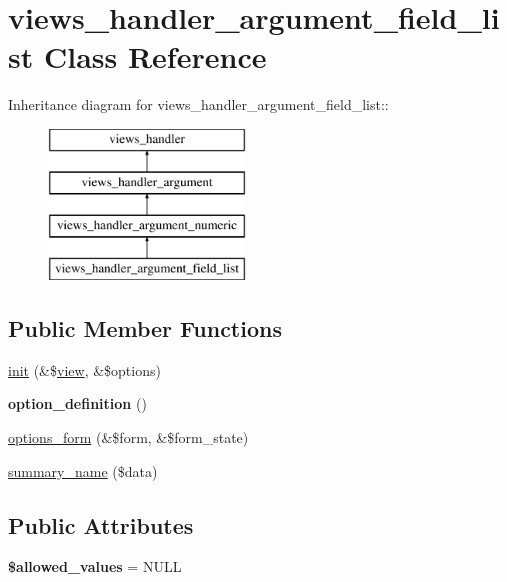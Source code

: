 \hypertarget{classviews__handler__argument__field__list}{
\section{views\_\-handler\_\-argument\_\-field\_\-list Class Reference}
\label{classviews__handler__argument__field__list}
}
Inheritance diagram for views\_\-handler\_\-argument\_\-field\_\-list::\begin{figure}[H]
\begin{center}
\leavevmode
\includegraphics[height=4cm]{classviews__handler__argument__field__list}
\end{center}
\end{figure}
\subsection*{Public Member Functions}
\begin{DoxyCompactItemize}
\item 
\hyperlink{classviews__handler__argument__field__list_ad0fd51038ca7c41ddd7f63715cb3c733}{init} (\&\$\hyperlink{classview}{view}, \&\$options)
\item 
\hypertarget{classviews__handler__argument__field__list_abfca864deef530908e32451246d70ac2}{
{\bfseries option\_\-definition} ()}
\label{classviews__handler__argument__field__list_abfca864deef530908e32451246d70ac2}

\item 
\hyperlink{classviews__handler__argument__field__list_a8fd9b838e00ade74124ff96dbfce439c}{options\_\-form} (\&\$form, \&\$form\_\-state)
\item 
\hyperlink{classviews__handler__argument__field__list_acea7796e64251a82b2ad492b836ffbc8}{summary\_\-name} (\$data)
\end{DoxyCompactItemize}
\subsection*{Public Attributes}
\begin{DoxyCompactItemize}
\item 
\hypertarget{classviews__handler__argument__field__list_a7451abd0096da2205a842bf2078b49c7}{
{\bfseries \$allowed\_\-values} = NULL}
\label{classviews__handler__argument__field__list_a7451abd0096da2205a842bf2078b49c7}

\end{DoxyCompactItemize}


